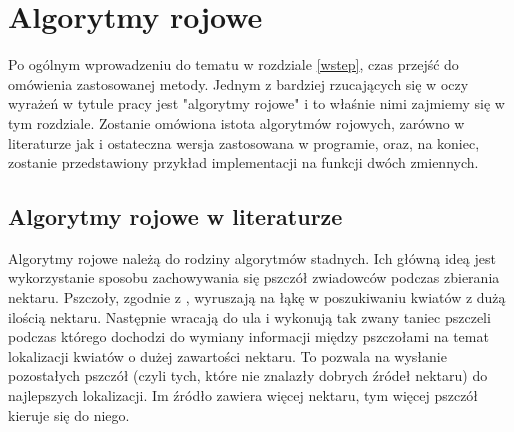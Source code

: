 
\chapter{Algorytmy rojowe} \label{algo}

Po ogólnym wprowadzeniu do tematu w rozdziale \ref{wstep}, czas przejść do omówienia zastosowanej metody. Jednym z bardziej rzucających się w oczy wyrażeń w tytule pracy jest "algorytmy rojowe" i to właśnie nimi zajmiemy się w tym rozdziale. Zostanie omówiona istota algorytmów rojowych, zarówno w literaturze jak i ostateczna wersja zastosowana w programie, oraz, na koniec, zostanie przedstawiony przykład implementacji na funkcji dwóch zmiennych.


\section{Algorytmy rojowe w literaturze}

Algorytmy rojowe należą do rodziny algorytmów stadnych. Ich główną ideą jest wykorzystanie sposobu zachowywania się pszczół zwiadowców podczas zbierania nektaru. Pszczoły, zgodnie z \cite{algroj}, wyruszają na łąkę w poszukiwaniu kwiatów z dużą ilością nektaru. Następnie wracają do ula i wykonują tak zwany taniec pszczeli podczas którego dochodzi do wymiany informacji między pszczołami na temat lokalizacji kwiatów o dużej zawartości nektaru. To pozwala na wysłanie pozostałych pszczół (czyli tych, które nie znalazły dobrych źródeł nektaru) do najlepszych lokalizacji. Im źródło zawiera więcej nektaru, tym więcej pszczół kieruje się do niego.

